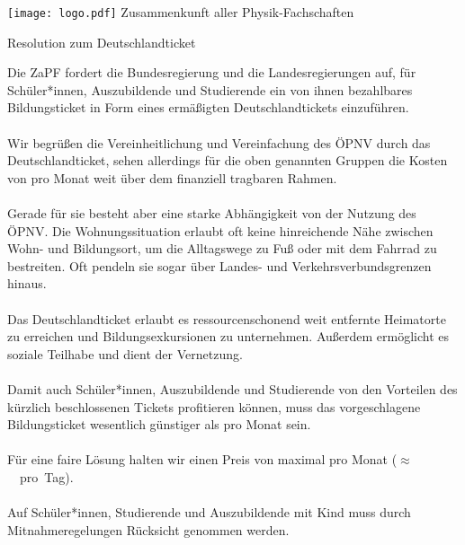 \documentclass[DIV=calc]{scrartcl}
\begin{document}
\hspace{0.87\textwidth}
\begin{minipage}{120pt}
	\vspace{-1.8cm}
	\texttt{[image: logo.pdf]}
	\centering
	\small Zusammenkunft aller Physik-Fachschaften
\end{minipage}

\begin{center}
  \huge{Resolution zum Deutschlandticket}\vspace{.25\baselineskip}\\
  \normalsize
\end{center}
\vspace{1cm}

Die ZaPF fordert die Bundesregierung und die Landesregierungen auf, für Schüler*innen, Auszubildende und Studierende ein von ihnen bezahlbares Bildungsticket in Form eines ermäßigten Deutschlandtickets einzuführen.\\\\
Wir begrüßen die Vereinheitlichung und Vereinfachung des ÖPNV durch das Deutschlandticket, sehen allerdings für die oben genannten Gruppen die Kosten von  pro Monat weit über dem finanziell tragbaren Rahmen.\\\\
Gerade für sie besteht aber eine starke Abhängigkeit von der Nutzung des ÖPNV. Die Wohnungssituation erlaubt oft keine hinreichende Nähe zwischen Wohn- und Bildungsort, um die Alltagswege zu Fuß oder mit dem Fahrrad zu bestreiten. Oft pendeln sie sogar über Landes- und Verkehrsverbundsgrenzen hinaus.\\\\
Das Deutschlandticket erlaubt es ressourcenschonend weit entfernte Heimatorte zu erreichen und Bildungsexkursionen zu unternehmen. Außerdem ermöglicht es soziale Teilhabe und dient der Vernetzung.\\\\
Damit auch Schüler*innen, Auszubildende und Studierende von den Vorteilen des kürzlich beschlossenen Tickets profitieren können, muss das vorgeschlagene Bildungsticket wesentlich günstiger als  pro Monat sein.\\\\
Für eine faire Lösung halten wir einen Preis von maximal  pro Monat ($\approx$~~pro~Tag).\\\\
Auf Schüler*innen, Studierende und Auszubildende mit Kind muss durch Mitnahmeregelungen Rücksicht genommen werden.\\\\
\end{document}
